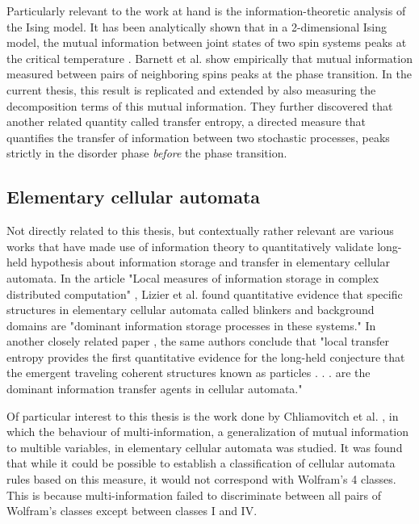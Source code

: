 \documentclass[12pt]{article}
\begin{document}
Particularly relevant to the work at hand is the information-theoretic analysis of the Ising model. It has been analytically shown that in a 2-dimensional Ising model, the mutual information between joint states of two spin systems peaks at the critical temperature \cite{mi-ising-analytic}. Barnett et al. \cite{barnett-ising} show empirically that mutual information measured between pairs of neighboring spins peaks at the phase transition. In the current thesis, this result is replicated and extended by also measuring the decomposition terms of this mutual information. They  further discovered that another related quantity called transfer entropy, a directed measure that quantifies the transfer of information between two stochastic processes, peaks strictly in the disorder phase \textit{before} the phase transition. 

\subsection{Elementary cellular automata}

Not directly related to this thesis, but contextually rather relevant are various works that have made use of information theory to quantitatively validate long-held hypothesis about information storage and transfer in elementary cellular automata. In the article "Local measures of information storage in complex distributed computation" \cite{active-inf-storage}, Lizier et al. found quantitative evidence that specific structures in elementary cellular automata called blinkers and background domains are "dominant information storage processes in these systems." In another closely related paper \cite{local-transfer-entropy-ca}, the same authors conclude that "local transfer entropy provides the first quantitative evidence for the long-held conjecture that the emergent traveling coherent structures known as particles . . . are the dominant information transfer agents in cellular automata."

Of particular interest to this thesis is the work done by Chliamovitch et al. \cite{multi-inf-ca}, in which the behaviour of multi-information, a generalization of mutual information to multible variables, in elementary cellular automata was studied. It was found that while it could be possible to establish a classification of cellular automata rules based on this measure, it would not correspond with Wolfram's 4 classes. This is because multi-information failed to discriminate between all pairs of Wolfram's classes except between classes I and IV.
\end{document}
